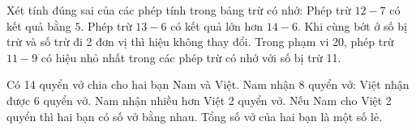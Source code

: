 \begin{ex} %
Xét tính đúng sai của các phép tính trong bảng trừ có nhớ:
\choiceTF
{\True Phép trừ $12 - 7$ có kết quả bằng $5$.}
{Phép trừ $13 - 6$ có kết quả lớn hơn $14 - 6$.}
{\True Khi cùng bớt ở số bị trừ và số trừ đi 2 đơn vị thì hiệu không thay đổi.}
{\True Trong phạm vi 20, phép trừ $11 - 9$ có hiệu nhỏ nhất trong các phép trừ có nhớ với số bị trừ 11.}
\end{ex}

\begin{ex} %
Có 14 quyển vở chia cho hai bạn Nam và Việt. Nam nhận 8 quyển vở:
\choiceTF
{\True Việt nhận được 6 quyển vở.}
{\True Nam nhận nhiều hơn Việt 2 quyển vở.}
{Nếu Nam cho Việt 2 quyển thì hai bạn có số vở bằng nhau.}
{Tổng số vở của hai bạn là một số lẻ.}
\end{ex}


